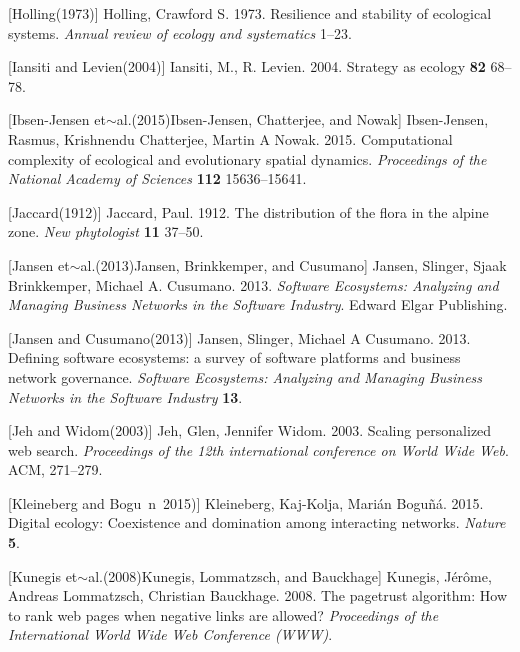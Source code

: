 \documentclass{article} %
\begin{document}
[Holling(1973)]  Holling, Crawford S. 1973.    Resilience and stability of ecological systems.    \textit{ Annual review of ecology and systematics} 1--23.

\noindent 

[Iansiti and Levien(2004)]  Iansiti, M., R. Levien. 2004.    Strategy as ecology \textbf{ 82} 68--78.

\noindent 

[Ibsen-Jensen et$\sim$al.(2015)Ibsen-Jensen, Chatterjee, and Nowak]  Ibsen-Jensen, Rasmus, Krishnendu Chatterjee, Martin A Nowak. 2015.    Computational complexity of ecological and evolutionary spatial dynamics.    \textit{ Proceedings of the National Academy of Sciences} \textbf{ 112} 15636--15641.

\noindent 

[Jaccard(1912)]  Jaccard, Paul. 1912.    The distribution of the flora in the alpine zone.    \textit{ New phytologist} \textbf{ 11} 37--50.

\noindent 

[Jansen et$\sim$al.(2013)Jansen, Brinkkemper, and Cusumano]  Jansen, Slinger, Sjaak Brinkkemper, Michael A. Cusumano. 2013.    \textit{ Software Ecosystems: Analyzing and Managing Business Networks in the Software Industry}.    Edward Elgar Publishing.

\noindent 

[Jansen and Cusumano(2013)]  Jansen, Slinger, Michael A Cusumano. 2013.    Defining software ecosystems: a survey of software platforms and business network governance.    \textit{ Software Ecosystems: Analyzing and Managing Business Networks in the Software Industry} \textbf{ 13}.

\noindent 

[Jeh and Widom(2003)]  Jeh, Glen, Jennifer Widom. 2003.    Scaling personalized web search.    \textit{ Proceedings of the 12th international conference on World Wide Web}. ACM, 271--279.

\noindent 

[Kleineberg and Bogu~n~2015)]  Kleineberg, Kaj-Kolja, Mari\'{a}n Bogu\~{n}\'{a}. 2015.    Digital ecology: Coexistence and domination among interacting networks.    \textit{ Nature} \textbf{ 5}.

\noindent 

[Kunegis et$\sim$al.(2008)Kunegis, Lommatzsch, and Bauckhage]  Kunegis, J\'{e}r\^{o}me, Andreas Lommatzsch, Christian Bauckhage. 2008.    The pagetrust algorithm: How to rank web pages when negative links are allowed?    \textit{ Proceedings of the International World Wide Web Conference (WWW)}.
\end{document}
